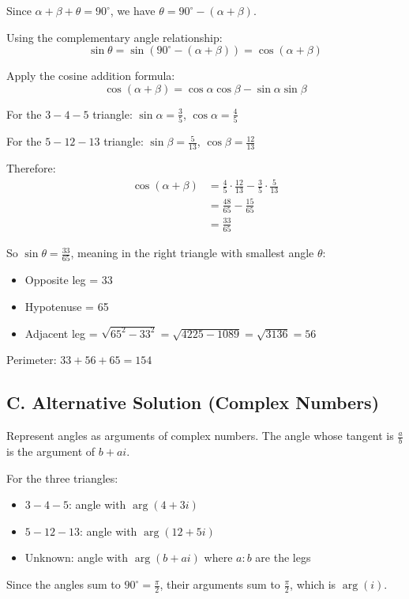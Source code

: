 \documentclass[12pt]{article}
\begin{document}
\begin{solutionbox}
Since $\alpha + \beta + \theta = 90^{\circ}$, we have $\theta = 90^{\circ} - (\alpha + \beta)$.

Using the complementary angle relationship:
$$\sin\theta = \sin(90^{\circ} - (\alpha + \beta)) = \cos(\alpha + \beta)$$

Apply the cosine addition formula:
$$\cos(\alpha + \beta) = \cos\alpha \cos\beta - \sin\alpha \sin\beta$$

For the $3-4-5$ triangle: $\sin\alpha = \frac{3}{5}$, $\cos\alpha = \frac{4}{5}$

For the $5-12-13$ triangle: $\sin\beta = \frac{5}{13}$, $\cos\beta = \frac{12}{13}$

Therefore:
\begin{align*}
    \cos(\alpha + \beta) &= \frac{4}{5} \cdot \frac{12}{13} - \frac{3}{5} \cdot \frac{5}{13} \\
    &= \frac{48}{65} - \frac{15}{65} \\
    &= \frac{33}{65}
\end{align*}

So $\sin\theta = \frac{33}{65}$, meaning in the right triangle with smallest angle $\theta$:
\begin{itemize}
    \item Opposite leg = 33
    \item Hypotenuse = 65
    \item Adjacent leg = $\sqrt{65^2 - 33^2} = \sqrt{4225 - 1089} = \sqrt{3136} = 56$
\end{itemize}

Perimeter: $33 + 56 + 65 = 154$

\subsection*{C. Alternative Solution (Complex Numbers)}

Represent angles as arguments of complex numbers. The angle whose tangent is $\frac{a}{b}$ is the argument of $b + ai$.

For the three triangles:
\begin{itemize}
    \item $3-4-5$: angle with $\arg(4 + 3i)$
    \item $5-12-13$: angle with $\arg(12 + 5i)$
    \item Unknown: angle with $\arg(b + ai)$ where $a:b$ are the legs
\end{itemize}

Since the angles sum to $90^{\circ} = \frac{\pi}{2}$, their arguments sum to $\frac{\pi}{2}$, which is $\arg(i)$.


\end{solutionbox}
\end{document}
